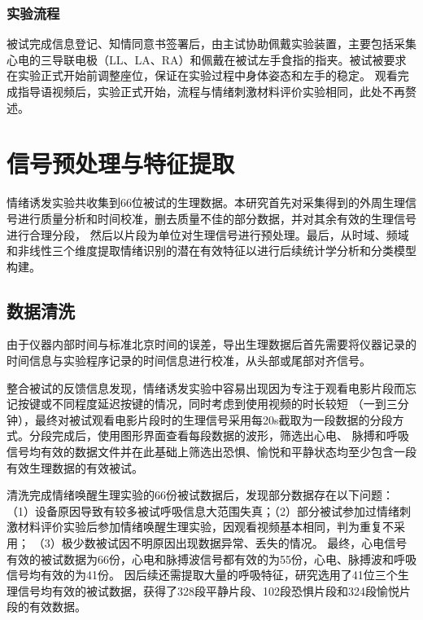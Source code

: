 \subsubsection{实验流程}
被试完成信息登记、知情同意书签署后，由主试协助佩戴实验装置，主要包括采集心电的三导联电极（LL、LA、RA）和佩戴在被试左手食指的指夹。被试被要求在实验正式开始前调整座位，保证在实验过程中身体姿态和左手的稳定。
观看完成指导语视频后，实验正式开始，流程与情绪刺激材料评价实验相同，此处不再赘述。

\clearpage
\section{信号预处理与特征提取}
情绪诱发实验共收集到66位被试的生理数据。本研究首先对采集得到的外周生理信号进行质量分析和时间校准，删去质量不佳的部分数据，并对其余有效的生理信号进行合理分段，
然后以片段为单位对生理信号进行预处理。最后，从时域、频域和非线性三个维度提取情绪识别的潜在有效特征以进行后续统计学分析和分类模型构建。

\subsection{数据清洗}
由于仪器内部时间与标准北京时间的误差，导出生理数据后首先需要将仪器记录的时间信息与实验程序记录的时间信息进行校准，从头部或尾部对齐信号。

整合被试的反馈信息发现，情绪诱发实验中容易出现因为专注于观看电影片段而忘记按键或不同程度延迟按键的情况，同时考虑到使用视频的时长较短
（一到三分钟），最终对被试观看电影片段时的生理信号采用每20s截取为一段数据的分段方式。分段完成后，使用图形界面查看每段数据的波形，筛选出心电、
脉搏和呼吸信号均有效的数据文件并在此基础上筛选出恐惧、愉悦和平静状态均至少包含一段有效生理数据的有效被试。


清洗完成情绪唤醒生理实验的66份被试数据后，发现部分数据存在以下问题：
（1）设备原因导致有较多被试呼吸信息大范围失真；（2）部分被试参加过情绪刺激材料评价实验后参加情绪唤醒生理实验，因观看视频基本相同，判为重复不采用；
（3）极少数被试因不明原因出现数据异常、丢失的情况。
最终，心电信号有效的被试数据为66份，心电和脉搏波信号都有效的为55份，心电、脉搏波和呼吸信号均有效的为41份。
因后续还需提取大量的呼吸特征，研究选用了41位三个生理信号均有效的被试数据，获得了328段平静片段、102段恐惧片段和324段愉悦片段的有效数据。

